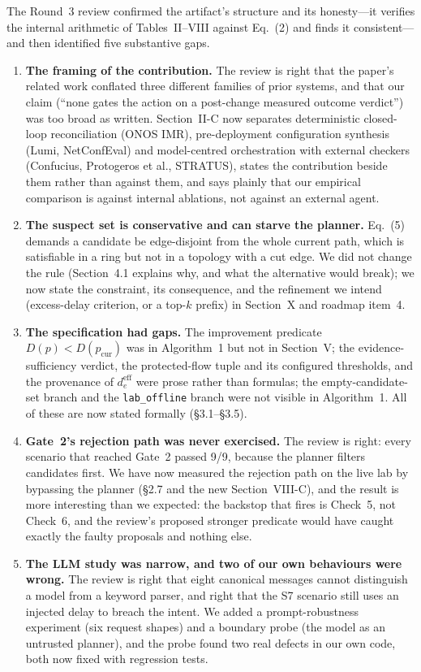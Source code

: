 \documentclass[11pt,a4paper]{article}
\begin{document}
The Round~3 review confirmed the artifact's structure and its honesty---it
verifies the internal arithmetic of Tables~II--VIII against Eq.~(2) and
finds it consistent---and then identified five substantive gaps.

\begin{enumerate}
  \item \textbf{The framing of the contribution.} The review is right that
    the paper's related work conflated three different families of prior
    systems, and that our claim (``none gates the action on a post-change
    measured outcome verdict'') was too broad as written. Section~II-C now
    separates deterministic closed-loop reconciliation (ONOS IMR),
    pre-deployment configuration synthesis (Lumi, NetConfEval) and
    model-centred orchestration with external checkers (Confucius,
    Protogeros et al., STRATUS), states the contribution beside them rather
    than against them, and says plainly that our empirical comparison is
    against internal ablations, not against an external agent.
  \item \textbf{The suspect set is conservative and can starve the planner.}
    Eq.~(5) demands a candidate be edge-disjoint from the whole current
    path, which is satisfiable in a ring but not in a topology with a cut
    edge. We did not change the rule (Section~4.1 explains why, and what
    the alternative would break); we now state the constraint, its
    consequence, and the refinement we intend (excess-delay criterion, or a
    top-$k$ prefix) in Section~X and roadmap item~4.
  \item \textbf{The specification had gaps.} The improvement predicate
    $D(p)<D(p_{\mathrm{cur}})$ was in Algorithm~1 but not in
    Section~V; the evidence-sufficiency verdict, the protected-flow tuple
    and its configured thresholds, and the provenance of $d^{\mathrm{eff}}_e$
    were prose rather than formulas; the empty-candidate-set branch and the
    \texttt{lab\_offline} branch were not visible in Algorithm~1. All of
    these are now stated formally (\S3.1--\S3.5).
  \item \textbf{Gate~2's rejection path was never exercised.} The review is
    right: every scenario that reached Gate~2 passed 9/9, because the
    planner filters candidates first. We have now measured the rejection
    path on the live lab by bypassing the planner (\S2.7 and the new
    Section~VIII-C), and the result is more interesting than we expected:
    the backstop that fires is Check~5, not Check~6, and the review's
    proposed stronger predicate would have caught exactly the faulty
    proposals and nothing else.
  \item \textbf{The LLM study was narrow, and two of our own behaviours
    were wrong.} The review is right that eight canonical messages cannot
    distinguish a model from a keyword parser, and right that the S7
    scenario still uses an injected delay to breach the intent. We added a
    prompt-robustness experiment (six request shapes) and a boundary probe
    (the model as an untrusted planner), and the probe found two real
    defects in our own code, both now fixed with regression tests.
\end{enumerate}
\end{document}
